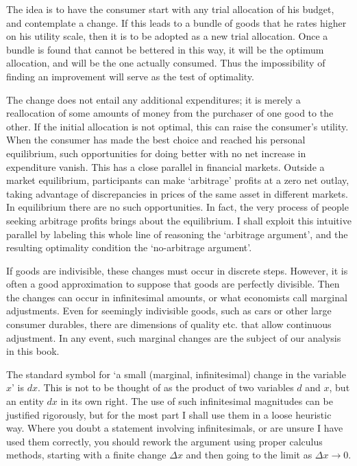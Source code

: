 The idea is to have the consumer start with any trial allocation of his budget, and contemplate a change. If this leads to a bundle of goods that he rates higher on his utility scale, then it is to be adopted as a new trial allocation. Once a bundle is found that cannot be bettered in this way, it will be the optimum allocation, and will be the one actually consumed. Thus the impossibility of finding an improvement will serve as the test of optimality.

The change does not entail any additional expenditures; it is merely a reallocation of some amounts of money from the purchaser of one good to the other. If the initial allocation is not optimal, this can raise the consumer's utility. When the consumer has made the best choice and reached his personal equilibrium, such opportunities for doing better with no net increase in expenditure vanish. This has a close parallel in financial markets. Outside a market equilibrium, participants can make `arbitrage' profits at a zero net outlay, taking advantage of discrepancies in prices of the same asset in different markets. In equilibrium there are no such opportunities. In fact, the very process of people seeking arbitrage profits brings about the equilibrium. I shall exploit this intuitive parallel by labeling this whole line of reasoning the `arbitrage argument', and the resulting optimality condition the `no-arbitrage argument'.

If goods are indivisible, these changes must occur in discrete steps. However, it is often a good approximation to suppose that goods are perfectly divisible. Then the changes can occur in infinitesimal amounts, or what economists call marginal adjustments. Even for seemingly indivisible goods, such as cars or other large consumer durables, there are dimensions of quality etc. that allow continuous adjustment. In any event, such marginal changes are the subject of our analysis in this book.

The standard symbol for `a small (marginal, infinitesimal) change in the variable $x$' is $dx$. This is not to be thought of as the product of two variables $d$ and $x$, but an entity $dx$ in its own right. The use of such infinitesimal magnitudes can be justified rigorously, but for the most part I shall use them in a loose heuristic way. Where you doubt a statement involving infinitesimals, or are unsure I have used them correctly, you should rework the argument using proper calculus methods, starting with a finite change $\Delta x$ and then going to the limit as $\Delta x \rightarrow 0$.

